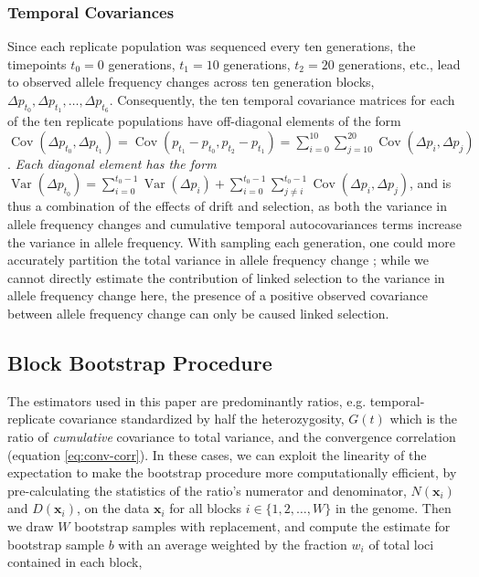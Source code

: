 \documentclass[11pt]{article}
\newcommand{\vb}[1]{{\it \color{blue} #1}}
\DeclareMathOperator{\var}{Var}
\DeclareMathOperator{\cov}{Cov}
\begin{document}
\subsubsection{\textcite{Barghi2019-qy} Temporal Covariances}
\label{supp:barghi-covs}

Since each replicate population was sequenced every ten generations, the
timepoints $t_0 = 0$ generations, $t_1 = 10$ generations, $t_2 = 20$
generations, etc., lead to observed allele frequency changes across ten
generation blocks, $\Delta p_{t_0}, \Delta p_{t_1}, \ldots, \Delta p_{t_6}$.
Consequently, the ten temporal covariance matrices for each of the ten
replicate populations have off-diagonal elements of the form $\cov(\Delta
p_{t_0}, \Delta p_{t_1}) = \cov(p_{t_1} - p_{t_0}, p_{t_2} - p_{t_1}) =
\sum_{i=0}^{10} \sum_{j=10}^{20} \cov(\Delta p_i, \Delta p_j)$. \vb{Each
diagonal element has the form $\var(\Delta p_{t_0}) = \sum_{i=0}^{t_0-1}
\var(\Delta p_{i}) + \sum_{i = 0}^{t_0 - 1} \sum_{j \ne i}^{t_0-1} \cov(\Delta
p_{i}, \Delta p_{j})$}, and is thus a combination of the effects of drift and
selection, as both the variance in allele frequency changes and cumulative
temporal autocovariances terms increase the variance in allele frequency. With
sampling each generation, one could more accurately partition the total
variance in allele frequency change \parencite{Buffalo2019-io}; while we cannot
directly estimate the contribution of linked selection to the variance in
allele frequency change here, the presence of a positive observed covariance
between allele frequency change can only be caused linked selection. 

\subsection{Block Bootstrap Procedure}
\label{supp:block-bootstrap}


The estimators used in this paper are predominantly ratios, e.g.
temporal-replicate covariance standardized by half the heterozygosity, $G(t)$
which is the ratio of \vb{cumulative} covariance to total variance, and the
convergence correlation (equation \eqref{eq:conv-corr}). In these cases, we can
exploit the linearity of the expectation to make the bootstrap procedure more
computationally efficient, by pre-calculating the statistics of the ratio's
numerator and denominator, $N(\mathbf{x}_i)$ and $D(\mathbf{x}_i)$, on the data
$\mathbf{x}_i$ for all blocks $i \in \{1, 2, \ldots, W\}$ in the genome. Then
we draw $W$ bootstrap samples with replacement, and compute the estimate for
bootstrap sample $b$ with an average weighted by the fraction $w_i$ of total
loci contained in each block, 
\end{document}
